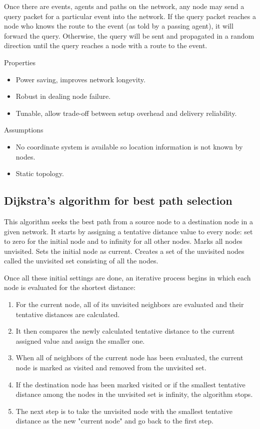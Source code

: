 Once there are events, agents and paths on the network, any node may send a query packet for a particular event into the network. 
If the query packet reaches a node who knows the route to the event (as told by a passing agent), it will forward the query. 
Otherwise, the query will be sent and propagated in a random direction until the query reaches a node with a route to the event. 

Properties
\begin{itemize}[noitemsep]
	\item Power saving, improves network longevity.
	\item Robust in dealing node failure.
	\item Tunable, allow trade-off between setup overhead and delivery reliability.
\end{itemize}
 Assumptions
\begin{itemize}[noitemsep]
	\item No coordinate system is available so location information is not known by nodes.
	\item Static topology.
\end{itemize}

\subsection{Dijkstra's algorithm for best path selection}
This algorithm seeks the best path from a source node to a destination node in a given network.
It starts by assigning a tentative distance value to every node: set to zero for the initial node and to infinity for all other nodes.
Marks all nodes unvisited. Sets the initial node as current. Creates a set of the unvisited nodes called the unvisited set consisting of all the nodes.

Once all these initial settings are done, an iterative process begins in which each node is evaluated for the shortest distance:
\begin{enumerate}[noitemsep]
	\item For the current node, all of its unvisited neighbors are evaluated and their tentative distances are calculated.
	\item It then compares the newly calculated tentative distance to the current assigned value and assign the smaller one. 
	\item When all of neighbors of the current node has been evaluated, the current node is marked as visited and removed from the unvisited set. 
	\item If the destination node has been marked visited or if the smallest tentative distance among the nodes in the unvisited set is infinity, the algorithm stops.
	\item The next step is to take the unvisited node with the smallest tentative distance as the new "current node" and go back to the first step.
\end{enumerate}

